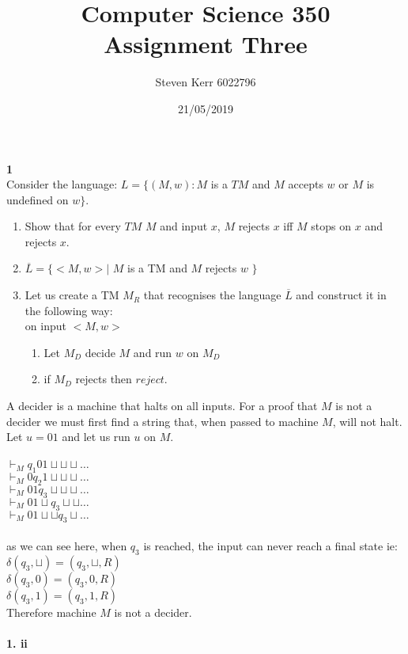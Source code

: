 \documentclass[a4paper,12pt]{article}
\title{Computer Science 350 \\
\large Assignment Three}
\author{Steven Kerr 6022796}
\date{21/05/2019}
\begin{document}
\maketitle

\noindent \textbf{1} \\
Consider the language: $L=\{(M,w) : M$ is a $TM$ and $M$ accepts $w$ or $M$ is undefined on $w\}$.
\noindent \begin{enumerate}[label=\alph*)]
\item Show that for every $TM$ $M$ and input $x$, $M$ rejects $x$ iff $M$ stops on $x$ and rejects $x$.
\item $\overline{L}=\{ <M, w> |$ $M$ is a TM and $M$ rejects $w$ $\}$ 
\item Let us create a TM $M_R$ that recognises the language $\overline{L}$ and construct it in the following way: \\
on input $<M, w>$
\begin{enumerate}
\item Let $M_D$ decide $M$ and run $w$ on $M_D$
\item if $M_D$ rejects then $reject$.
\end{enumerate}
\end{enumerate}
A decider is a machine that halts on all inputs. For a proof that $M$ is not a decider we must first find a string that, when passed to machine $M$, will not halt. \\
Let $u=01$ and let us run $u$ on $M$. \\
\\
$\vdash_M q_1 0 1 \sqcup \sqcup \sqcup \dots$ \\
$\vdash_M 0 q_2 1 \sqcup \sqcup \sqcup \dots$ \\
$\vdash_M 0 1 q_3 \sqcup \sqcup \sqcup \dots$ \\
$\vdash_M 0 1 \sqcup q_3 \sqcup \sqcup \dots$ \\
$\vdash_M 0 1 \sqcup \sqcup q_3 \sqcup \dots$ \\
\\
as we can see here, when $q_3$ is reached, the input can never reach a final state ie: \\
$\delta ( q_3 , \sqcup ) = ( q_3 , \sqcup , R )$ \\
$\delta ( q_3 , 0 ) = ( q_3 , 0 , R )$ \\
$\delta ( q_3 , 1 ) = ( q_3 , 1 , R )$ \\
Therefore machine $M$ is not a decider. \\
\\
\textbf{1. ii} \\
\end{document}
